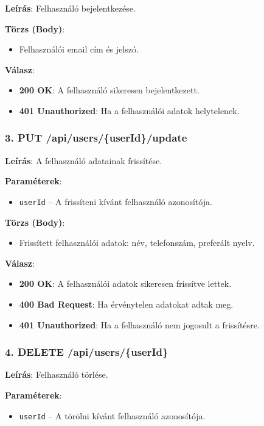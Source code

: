 \documentclass{report}[11pt]
\begin{document}
\textbf{Leírás}:  
Felhasználó bejelentkezése.

\textbf{Törzs (Body)}:  
\begin{itemize}
    \item Felhasználói email cím és jelszó.
\end{itemize}

\textbf{Válasz}:  
\begin{itemize}
    \item \textbf{200 OK}: A felhasználó sikeresen bejelentkezett.
    \item \textbf{401 Unauthorized}: Ha a felhasználói adatok helytelenek.
\end{itemize}

\subsubsection{3. PUT /api/users/\{userId\}/update}

\textbf{Leírás}:  
A felhasználó adatainak frissítése.

\textbf{Paraméterek}:  
\begin{itemize}
    \item \texttt{userId} – A frissíteni kívánt felhasználó azonosítója.
\end{itemize}

\textbf{Törzs (Body)}:  
\begin{itemize}
    \item Frissített felhasználói adatok: név, telefonszám, preferált nyelv.
\end{itemize}

\textbf{Válasz}:  
\begin{itemize}
    \item \textbf{200 OK}: A felhasználói adatok sikeresen frissítve lettek.
    \item \textbf{400 Bad Request}: Ha érvénytelen adatokat adtak meg.
    \item \textbf{401 Unauthorized}: Ha a felhasználó nem jogosult a frissítésre.
\end{itemize}

\subsubsection{4. DELETE /api/users/\{userId\}}

\textbf{Leírás}:  
Felhasználó törlése.

\textbf{Paraméterek}:  
\begin{itemize}
    \item \texttt{userId} – A törölni kívánt felhasználó azonosítója.
\end{itemize}
\end{document}
